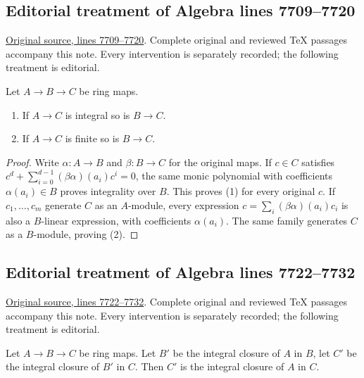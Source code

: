 \subsection{Editorial treatment of Algebra lines 7709--7720}

\hypertarget{algebra-context-079}{}

\noindent\href{https://github.com/stacks/stacks-project/blob/a04446e57ec1fbc252a871afcec7752fb2807b14/algebra.tex\#L7709}{Original source, lines 7709--7720}. Complete original and reviewed TeX passages accompany this note. Every intervention is separately recorded; the following treatment is editorial.


\begin{lemma}
\label{editorial-source-lemma-integral-permanence}
Let $A \to B \to C$ be ring maps.
\begin{enumerate}
\item If $A \to C$ is integral so is $B \to C$.
\item If $A \to C$ is finite so is $B \to C$.
\end{enumerate}
\end{lemma}

\begin{proof}
Write $\alpha:A\to B$ and $\beta:B\to C$ for the original maps.
If $c\in C$ satisfies
$c^d+\sum_{i=0}^{d-1}(\beta\alpha)(a_i)c^i=0$, the same monic
polynomial with coefficients $\alpha(a_i)\in B$ proves integrality
over $B$. This proves (1) for every original $c$.
If $c_1,\ldots,c_m$ generate $C$ as an $A$-module, every expression
$c=\sum_i(\beta\alpha)(a_i)c_i$ is also a $B$-linear expression,
with coefficients $\alpha(a_i)$. The same family generates $C$
as a $B$-module, proving (2).
\end{proof}


\subsection{Editorial treatment of Algebra lines 7722--7732}

\hypertarget{algebra-context-080}{}

\noindent\href{https://github.com/stacks/stacks-project/blob/a04446e57ec1fbc252a871afcec7752fb2807b14/algebra.tex\#L7722}{Original source, lines 7722--7732}. Complete original and reviewed TeX passages accompany this note. Every intervention is separately recorded; the following treatment is editorial.


\begin{lemma}
\label{editorial-source-lemma-integral-closure-transitive}
Let $A \to B \to C$ be ring maps.
Let $B'$ be the integral closure of $A$ in $B$,
let $C'$ be the integral closure of $B'$ in $C$. Then
$C'$ is the integral closure of $A$ in $C$.
\end{lemma}

